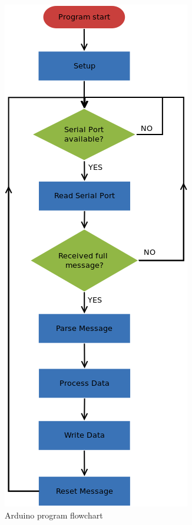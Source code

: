 	\begin{figure}[H]
			\centering
			\includegraphics[scale=0.75]{images/Diagrams/arduino2.png}
			\caption{Arduino program flowchart }
			\label{arduinoFlowchart}
	\end{figure}
	\bigskip


